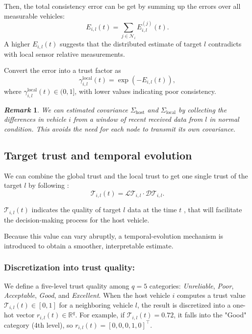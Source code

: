 \documentclass{ifacconf}
\def\N{\mathcal{N}} %
\def\LT{\mathcal{LT}} %
\def\DT{\mathcal{DT}} %
\def\T{\mathcal{T}} %
\newtheorem{remark}{\it \textbf{Remark}}%
\begin{document}
Then, the total consistency error can be get by summing up the errors over all measurable vehicles:
\begin{equation} 
    E_{i,l}(t) = \sum_{j \in \N_i} E_{i,l}^{(j)}(t).
\end{equation}
A higher $E_{i,l}(t)$  suggests that the distributed estimate of target $l$ contradicts with local sensor relative measurements.

Convert the error into a trust factor as
\begin{equation}
    \gamma_{i,l}^{\text{local}}(t) = \exp\left( -{E_{i,l}(t)} \right),
\end{equation}
where $\gamma_{i,l}^{\text{local}}(t) \in (0, 1]$, with lower values indicating poor consistency. 
\begin{remark}
We can estimated covariance $\Sigma_{\text{host}}$ and $\Sigma_{\text{local}}$ by collecting the differences in vehicle \(i\) from a window of recent received data from \(l\) in normal condition.
This avoids the need for each node to transmit its own covariance.
\end{remark}
\vspace*{-0.3cm}
\subsection{Target trust and temporal evolution}\label{subsec_evolution}
\vspace*{-0.2cm}
We can combine the global trust and the local trust to get one single trust of the target $l$ by following : 
\begin{equation}
    \T_{i,l}(t) =  \LT_{i,l} \cdot \DT_{i,l}. 
    \label{trs_sample_genral}
\end{equation}

$\T_{i,l}(t)$ indicates the quality of target $l$ data at the time $t$ , that will facilitate the decision-making process for the host vehicle.

Because this value can vary abruptly, a temporal-evolution mechanism is introduced to obtain a smoother, interpretable estimate.
\subsubsection{Discretization into trust quality:}
We define a five-level trust quality among $q = 5$ categories: \textit{Unreliable}, \textit{Poor}, \textit{Acceptable}, \textit{Good}, and \textit{Excellent}. When the host vehicle $i$ computes a trust value $\T_{i,l}(t) \in [0, 1]$ for a neighboring vehicle $l$, the result is discretized into a one-hot vector $r_{i,l}(t) \in \mathbb{R}^q$. For example, if $\T_{i,l}(t) = 0.72$, it falls into the "Good" category (4th level), so $r_{i,l}(t) = [0, 0, 0, 1, 0]^{\top}$.
\end{document}
